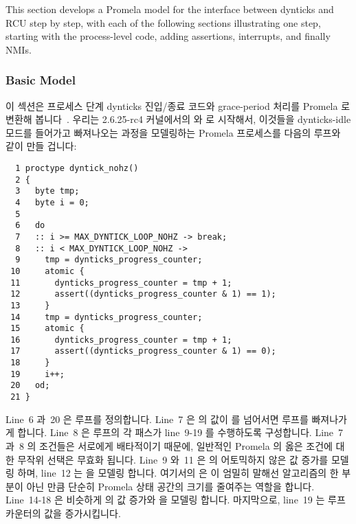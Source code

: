 This section develops a Promela model for the interface between
dynticks and RCU step by step, with each of the following sections
illustrating one step, starting with the process-level code,
adding assertions, interrupts, and finally NMIs.
\fi

\subsubsection{Basic Model}
\label{sec:formal:Basic Model}

이 섹션은 프로세스 단계 dynticks 진입/종료 코드와 grace-period 처리를 Promela
로 변환해 봅니다~\cite{Holzmann03a}.
우리는 2.6.25-rc4 커널에서의  와  로
시작해서, 이것들을 dynticks-idle 모드를 들어가고 빠져나오는 과정을 모델링하는
Promela 프로세스를 다음의 루프와 같이 만들 겁니다:
\iffalse

This section translates the process-level dynticks entry/exit
code and the grace-period processing into
Promela~\cite{Holzmann03a}.
We start with \co{rcu_exit_nohz()} and
\co{rcu_enter_nohz()}
from the 2.6.25-rc4 kernel, placing these in a single Promela
process that models exiting and entering dynticks-idle mode in
a loop as follows:
\fi

{ \scriptsize
\begin{verbatim}
  1 proctype dyntick_nohz()
  2 {
  3   byte tmp;
  4   byte i = 0;
  5
  6   do
  7   :: i >= MAX_DYNTICK_LOOP_NOHZ -> break;
  8   :: i < MAX_DYNTICK_LOOP_NOHZ ->
  9     tmp = dynticks_progress_counter;
 10     atomic {
 11       dynticks_progress_counter = tmp + 1;
 12       assert((dynticks_progress_counter & 1) == 1);
 13     }
 14     tmp = dynticks_progress_counter;
 15     atomic {
 16       dynticks_progress_counter = tmp + 1;
 17       assert((dynticks_progress_counter & 1) == 0);
 18     }
 19     i++;
 20   od;
 21 }
\end{verbatim}
}

Line~6 과~20 은 루프를 정의합니다.
Line~7 은  의 값이  를 넘어서면 루프를
빠져나가게 합니다.
Line~8 은 루프의 각 패스가 line~9-19 를 수행하도록 구성합니다.
Line~7 과~8 의 조건들은 서로에게 배타적이기 때문에, 일반적인 Promela 의 옳은
조건에 대한 무작위 선택은 무효화 됩니다.
Line~9 와~11 은  의 어토믹하지 않은
 값 증가를 모델링 하며, line~12 는 
을 모델링 합니다.
여기서의  은  이 엄밀히 말해선 알고리즘의 한 부분이
아닌 만큼 단순히 Promela 상태 공간의 크기를 줄여주는 역할을 합니다.
Line~14-18 은 비슷하게  의 값 증가와  을
모델링 합니다.
마지막으로, line~19 는 루프 카운터의 값을 증가시킵니다.
\iffalse

